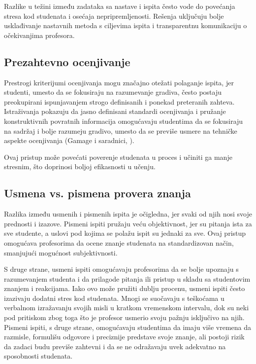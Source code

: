\documentclass[a4paper]{article}
\begin{document}
Razlike u težini između zadataka sa nastave i ispita često vode do povećanja stresa kod studenata i osećaja nepripremljenosti. Rešenja uključuju bolje usklađivanje nastavnih metoda s ciljevima ispita i transparentnu komunikaciju o očekivanjima profesora.

\subsection{Prezahtevno ocenjivanje}

Prestrogi kriterijumi ocenjivanja mogu značajno otežati polaganje ispita, jer studenti, umesto da se fokusiraju na razumevanje gradiva, često postaju preokupirani ispunjavanjem strogo definisanih i ponekad preteranih zahteva. Istraživanja pokazuju da jasno definisani standardi ocenjivanja i pružanje konstruktivnih povratnih informacija omogućavaju studentima da se fokusiraju na sadržaj i bolje razumeju gradivo, umesto da se previše usmere na tehničke aspekte ocenjivanja (Gamage i saradnici, \cite{gamage2022rethinking}). 

Ovaj pristup može povećati poverenje studenata u proces i učiniti ga manje stresnim, što doprinosi boljoj efikasnosti u učenju.

\subsection{Usmena vs. pismena provera znanja}

Razlika između usmenih i pismenih ispita je očigledna, jer svaki od njih nosi svoje prednosti i izazove. Pismeni ispiti pružaju veću objektivnost, jer su pitanja ista za sve studente, a uslovi pod kojima se polažu ispit su jednaki za sve. Ovaj pristup omogućava profesorima da ocene znanje studenata na standardizovan način, smanjujući mogućnost subjektivnosti.

S druge strane, usmeni ispiti omogućavaju profesorima da se bolje upoznaju s razumevanjem studenta i da prilagode pitanja ili pristup u skladu sa studentovim znanjem i reakcijama. Iako ovo može pružiti dublju procenu, usmeni ispiti često izazivaju dodatni stres kod studenata. Mnogi se suočavaju s teškoćama u verbalnom izražavanju svojih misli u kratkom vremenskom intervalu, dok su neki pod pritiskom zbog toga što je profesor usmerio svoju pažnju isključivo na njih. Pismeni ispiti, s druge strane, omogućavaju studentima da imaju više vremena da razmisle, formulišu odgovore i preciznije predstave svoje znanje, ali postoji rizik da zadaci budu previše zahtevni i da se ne odražavaju uvek adekvatno na sposobnosti studenata.
\end{document}
